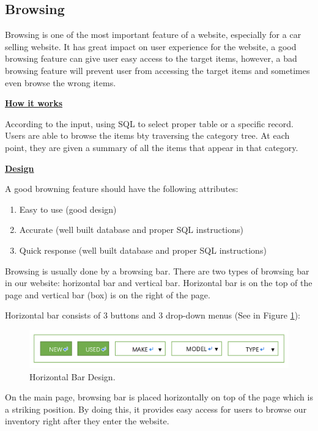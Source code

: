 \documentclass[12pt]{article}
\begin{document}
\subsection{Browsing}
Browsing is one of the most important feature of a website, especially for a car selling website. It has great impact on user experience for the website, a good browsing feature can give user easy access to the target items, however, a bad browsing feature will prevent user from accessing the target items and sometimes even browse the wrong items.\par
\textbf{\underline{How it works}}\par
According to the input, using SQL to select proper table or a specific record. Users are able to browse the items bty traversing the category tree. At each point, they are given a summary of all the items that appear in that category.\par
\textbf{\underline{Design}}\par
A good browning feature should have the following attributes:\par
\begin{enumerate}
\item Easy to use (good design)
\item Accurate (well built database and proper SQL instructions)
\item Quick response (well built database and proper SQL instructions)
\end{enumerate}
\par Browsing is usually done by a browsing bar. There are two types of browsing bar in our website: horizontal bar and vertical bar. Horizontal bar is on the top of the page and vertical bar (box) is on the right of the page.\par
Horizontal bar consists of 3 buttons and 3 drop-down menus (See in Figure \ref{horBar}):
\begin{figure}[!h]
\caption{Horizontal Bar Design.} \label{horBar}
\begin{center}
\includegraphics[width=\textwidth]{horizontal_bar}
\end{center}
\end{figure}
\par On the main page, browsing bar is placed horizontally on top of the page which is a striking position. By doing this, it provides easy access for users to browse our inventory right after they enter the website.\par
\end{document}
